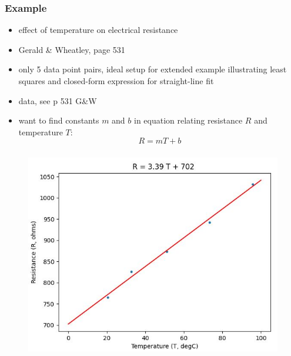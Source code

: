 \documentclass[english,14pt]{beamer}
\begin{document}

\begin{frame}[fragile]

\frametitle{Example}

\begin{itemize}
	\item effect of temperature on electrical resistance
	\item Gerald \& Wheatley, page 531
	\item only 5 data point pairs, ideal setup for extended example illustrating least squares and closed-form expression for straight-line fit
	\item data, see p 531 G\&W
	\item want to find constants $m$ and $b$ in equation relating resistance $R$ and temperature $T$:
	\[
		R = mT + b
	\]
	
\end{itemize}

\end{frame}


\begin{frame}[fragile]

\frametitle{}

\begin{figure}[ht]
	\centering
	\includegraphics[width=.8\textwidth]{figures/resistancetempOutput}
\end{figure}

\end{frame}

\end{document}
